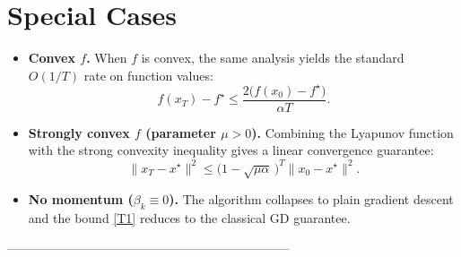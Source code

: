 \documentclass[11pt]{article}
\begin{document}
\section*{Special Cases}
\begin{itemize}
\item \textbf{Convex $f$.} When $f$ is convex, the same analysis yields the
standard $O(1/T)$ rate on function values:
\[
f(x_T)-f^\star\le\frac{2\bigl(f(x_0)-f^\star\bigr)}{\alpha T}.
\]
\item \textbf{Strongly convex $f$ (parameter $\mu>0$).} Combining the
Lyapunov function with the strong convexity inequality gives a linear
convergence guarantee:
\[
\|x_T-x^\star\|^{2}\le\bigl(1-\sqrt{\mu\alpha}\,\bigr)^{T}
\|x_0-x^\star\|^{2}.
\]
\item \textbf{No momentum ($\beta_k\equiv0$).} The algorithm collapses to plain
gradient descent and the bound \eqref{T1} reduces to the classical GD
guarantee.
\end{itemize}

--------------------------------------------------------------------
\end{document}
